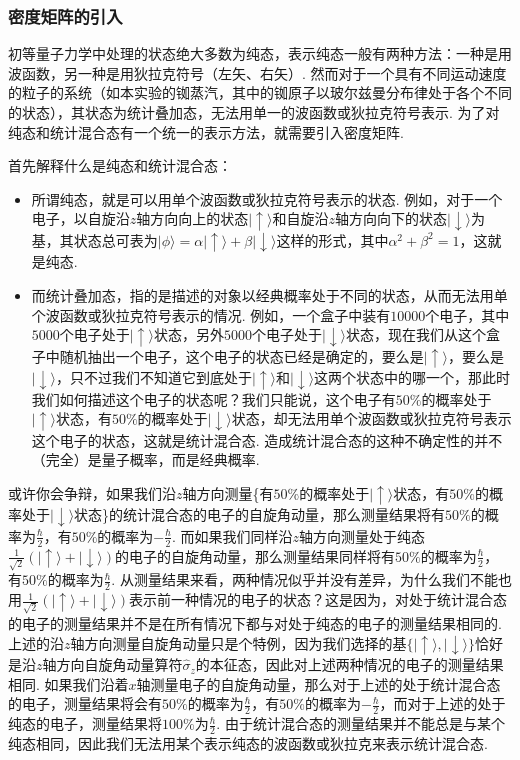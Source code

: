\documentclass{assignment}
\begin{document}
\subsubsection{密度矩阵的引入}
初等量子力学中处理的状态绝大多数为纯态，表示纯态一般有两种方法：一种是用波函数，另一种是用狄拉克符号（左矢、右矢）. 然而对于一个具有不同运动速度的粒子的系统（如本实验的铷蒸汽，其中的铷原子以玻尔兹曼分布律处于各个不同的状态），其状态为统计叠加态，无法用单一的波函数或狄拉克符号表示. 为了对纯态和统计混合态有一个统一的表示方法，就需要引入密度矩阵.

首先解释什么是纯态和统计混合态：
\begin{itemize}
    \item 所谓纯态，就是可以用单个波函数或狄拉克符号表示的状态. 例如，对于一个电子，以自旋沿$z$轴方向向上的状态$\lvert\uparrow\rangle$和自旋沿$z$轴方向向下的状态$\lvert\downarrow\rangle$为基，其状态总可表为$\lvert\phi\rangle=\alpha\lvert\uparrow\rangle+\beta\lvert\downarrow\rangle$这样的形式，其中$\alpha^2+\beta^2=1$，这就是纯态.
    \item 而统计叠加态，指的是描述的对象以经典概率处于不同的状态，从而无法用单个波函数或狄拉克符号表示的情况. 例如，一个盒子中装有$10000$个电子，其中$5000$个电子处于$\lvert\uparrow\rangle$状态，另外$5000$个电子处于$\lvert\downarrow\rangle$状态，现在我们从这个盒子中随机抽出一个电子，这个电子的状态已经是确定的，要么是$\lvert\uparrow\rangle$，要么是$\lvert\downarrow\rangle$，只不过我们不知道它到底处于$\lvert\uparrow\rangle$和$\lvert\downarrow\rangle$这两个状态中的哪一个，那此时我们如何描述这个电子的状态呢？我们只能说，这个电子有$50\%$的概率处于$\lvert\uparrow\rangle$状态，有$50\%$的概率处于$\lvert\downarrow\rangle$状态，却无法用单个波函数或狄拉克符号表示这个电子的状态，这就是统计混合态. 造成统计混合态的这种不确定性的并不（完全）是量子概率，而是经典概率.
\end{itemize}

或许你会争辩，如果我们沿$z$轴方向测量\{有$50\%$的概率处于$\lvert\uparrow\rangle$状态，有$50\%$的概率处于$\lvert\downarrow\rangle$状态\}的统计混合态的电子的自旋角动量，那么测量结果将有$50\%$的概率为$\frac{\hbar}{2}$，有$50\%$的概率为$-\frac{\hbar}{2}$. 而如果我们同样沿$z$轴方向测量处于纯态$\frac{1}{\sqrt{2}}(\lvert\uparrow\rangle+\lvert\downarrow\rangle)$的电子的自旋角动量，那么测量结果同样将有$50\%$的概率为$\frac{\hbar}{2}$，有$50\%$的概率为$\frac{\hbar}{2}$. 从测量结果来看，两种情况似乎并没有差异，为什么我们不能也用$\frac{1}{\sqrt{2}}(\lvert\uparrow\rangle+\lvert\downarrow\rangle)$表示前一种情况的电子的状态？这是因为，对处于统计混合态的电子的测量结果并不是在所有情况下都与对处于纯态的电子的测量结果相同的. 上述的沿$z$轴方向测量自旋角动量只是个特例，因为我们选择的基$\{\lvert\uparrow\rangle,\lvert\downarrow\rangle\}$恰好是沿$z$轴方向自旋角动量算符$\hat{\sigma}_z$的本征态，因此对上述两种情况的电子的测量结果相同. 如果我们沿着$x$轴测量电子的自旋角动量，那么对于上述的处于统计混合态的电子，测量结果将会有$50\%$的概率为$\frac{\hbar}{2}$，有$50\%$的概率为$-\frac{\hbar}{2}$，而对于上述的处于纯态的电子，测量结果将$100\%$为$\frac{\hbar}{2}$. 由于统计混合态的测量结果并不能总是与某个纯态相同，因此我们无法用某个表示纯态的波函数或狄拉克来表示统计混合态.
\end{document}
